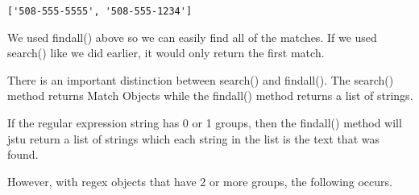 \documentclass[11pt]{article}
\begin{document}
\begin{verbatim}
['508-555-5555', '508-555-1234']
\end{verbatim}


We used findall() above so we can easily find all of the matches. If we used search() like we did earlier, it would only return the first match.

There is an important distinction between search() and findall(). The search() method returns Match Objects while the findall() method returns a list of strings.

If the regular expression string has 0 or 1 groups, then the findall() method will jstu return a list of strings which each string in the list is the text that was found.


However, with regex objects that have 2 or more groups, the following occurs.
\end{document}
